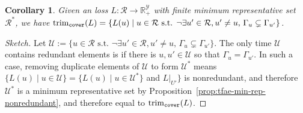 \documentclass[11pt]{article}
\newcommand{\Comments}{1}
\newcommand{\mynote}[2]{\ifnum\Comments=1\textcolor{#1}{#2}\fi}
\newcommand{\jessie}[1]{\mynote{teal}{[JF: #1]}}
\newcommand{\reals}{\mathbb{R}}
\newcommand{\R}{\mathcal{R}}
\newcommand{\U}{\mathcal{U}}
\newcommand{\Y}{\mathcal{Y}}
\newcommand{\risk}[1]{\underline{#1}}
\newcommand{\inter}[1]{\mathring{#1}}%
\newcommand{\trim}{\mathrm{trim}}
\newcommand{\trimcover}{\mathrm{trim}_{\tt cover}}
\newtheorem{corollary}{Corollary}
\begin{document}
\begin{corollary}\label{prop:trim-loss-condition}
  Given an loss $L : \R \to \reals^\Y_+$ with finite minimum representative set $\R^*$, we have $\trimcover(L) = \{L(u) \mid u \in \R \textrm{ s.t. } \neg\exists u'\in\R,u'\neq u,\, \Gamma_u \subsetneq \Gamma_{u'}\}$. 
\end{corollary}
\begin{proof}[Sketch]
  Let $\U := \{u \in \R \textrm{ s.t. } \neg\exists u'\in\R,u'\neq u,\, \Gamma_u \subsetneq \Gamma_{u'}\}$.
  The only time $\U$ contains redundant elements is if there is $u,u' \in \U$ so that $\Gamma_u = \Gamma_{u'}$.  In such a case, removing duplicate elements of $\U$ to form $\U^*$ means $\{L(u) \mid u \in \U\} = \{L(u) \mid u \in \U^*\}$ and $L|_{U'}\}$ is nonredundant, and therefore $\U^*$ is a minimum representative set by Proposition~\ref{prop:tfae-min-rep-nonredundant}, and therefore equal to $\trimcover(L)$.

  
\end{proof}
\end{document}
